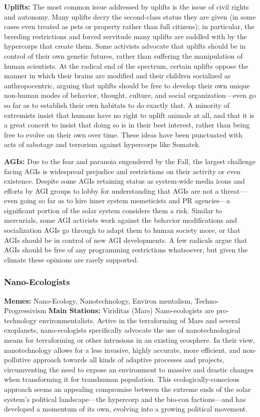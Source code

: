\textbf{Uplifts: }The most common issue addressed by uplifts 
is the issue of civil rights and autonomy. Many uplifts 
decry the second-class status they are given (in some 
cases even treated as pets or property rather than full 
citizens); in particular, the breeding restrictions and 
forced servitude many uplifts are saddled with by the 
hypercorps that create them. Some activists advocate 
that uplifts should be in control of their own genetic futures, rather than suffering the manipulation of human 
scientists. At the radical end of the spectrum, certain 
uplifts oppose the manner in which their brains are 
modified and their children socialized as anthropocentric, arguing that uplifts should be free to develop their 
own unique non-human modes of behavior, thought, 
culture, and social organization—even go so far as 
to establish their own habitats to do exactly that. A 
minority of extremists insist that humans have no right 
to uplift animals at all, and that it is a great conceit 
to insist that doing so is in their best interest, rather 
than being free to evolve on their own over time. These 
ideas have been punctuated with acts of sabotage and 
terrorism against hypercorps like Somatek.

\textbf{AGIs:} Due to the fear and paranoia engendered 
by the Fall, the largest challenge facing AGIs is widespread prejudice and restrictions on their activity or 
even existence. Despite some AGIs retaining status as 
system-wide media icons and efforts by AGI groups to 
lobby for understanding that AGIs are not a threat—
even going so far as to hire inner system memeticists 
and PR agencies—a significant portion of the solar 
system considers them a risk. Similar to mercurials, 
some AGI activists work against the behavior modifications and socialization AGIs go through to adapt 
them to human society more, or that AGIs should be 
in control of new AGI developments. A few radicals 
argue that AGIs should be free of any programming 
restrictions whatsoever, but given the climate these 
opinions are rarely supported.

\subsubsection{Nano-Ecologists}

\textbf{Memes:} Nano-Ecology, Nanotechnology, Environ
mentalism, Techno-Progressivism
\textbf{Main Stations:} Viriditas (Mars)
Nano-ecologists are pro-technology environmentalists. Active in the terraforming of Mars and several 
exoplanets, nano-ecologists specifically advocate the 
use of nanotechnological means for terraforming or 
other intrusions in an existing ecosphere. In their view, 
nanotechnology allows for a less invasive, highly accurate, more efficient, and non-pollutive approach 
towards all kinds of adaptive processes and projects, 
circumventing the need to expose an environment to 
massive and drastic changes when transforming it for 
transhuman population. This ecologically-conscious 
approach seems an appealing compromise between 
the extreme ends of the solar system's political landscape—the hypercorp and the bio-con factions—and 
has developed a momentum of its own, evolving into 
a growing political movement.

